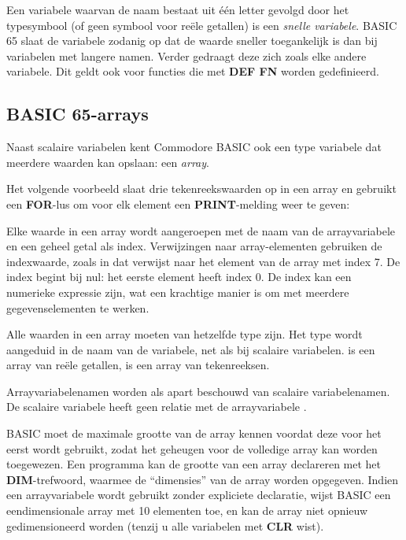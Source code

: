 Een variabele waarvan de naam bestaat uit één letter gevolgd door het typesymbool (of geen symbool voor reële getallen) is een {\em snelle variabele}. BASIC 65 slaat de variabele zodanig op dat de waarde sneller toegankelijk is dan bij variabelen met langere namen. Verder gedraagt deze zich zoals elke andere variabele. Dit geldt ook voor functies die met {\bf DEF FN} worden gedefinieerd.

\subsection{BASIC 65-arrays}

Naast scalaire variabelen kent Commodore BASIC ook een type variabele dat meerdere waarden kan opslaan: een {\em array}.

Het volgende voorbeeld slaat drie tekenreekswaarden op in een array en gebruikt een {\bf FOR}-lus om voor elk element een {\bf PRINT}-melding weer te geven:


Elke waarde in een array wordt aangeroepen met de naam van de arrayvariabele en een geheel getal als index. Verwijzingen naar array-elementen gebruiken de indexwaarde, zoals in  dat verwijst naar het element van de array  met index 7. De index begint bij nul: het eerste element heeft index 0. De index kan een numerieke expressie zijn, wat een krachtige manier is om met meerdere gegevenselementen te werken.

Alle waarden in een array moeten van hetzelfde type zijn. Het type wordt aangeduid in de naam van de variabele, net als bij scalaire variabelen.  is een array van reële getallen,  is een array van tekenreeksen.

Arrayvariabelenamen worden als apart beschouwd van scalaire variabelenamen. De scalaire variabele  heeft geen relatie met de arrayvariabele .

BASIC moet de maximale grootte van de array kennen voordat deze voor het eerst wordt gebruikt, zodat het geheugen voor de volledige array kan worden toegewezen. Een programma kan de grootte van een array declareren met het {\bf DIM}-trefwoord, waarmee de ``dimensies'' van de array worden opgegeven. Indien een arrayvariabele wordt gebruikt zonder expliciete declaratie, wijst BASIC een eendimensionale array met 10 elementen toe, en kan de array niet opnieuw gedimensioneerd worden (tenzij u alle variabelen met {\bf CLR} wist).

